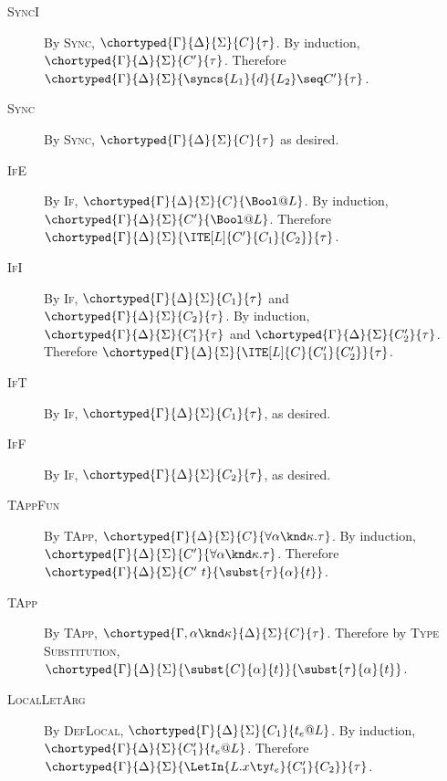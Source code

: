 \begin{description}
  \item[\textsc{SyncI}]
  By \textsc{Sync}, $\chortyped{\Gamma}{\Delta}{\Sigma}{C}{\tau}$.
  By induction, $\chortyped{\Gamma}{\Delta}{\Sigma}{C'}{\tau}$.
  Therefore $\chortyped{\Gamma}{\Delta}{\Sigma}{\syncs{L_1}{d}{L_2} \seq C'}{\tau}$.

  \item[\textsc{Sync}]
  By \textsc{Sync}, $\chortyped{\Gamma}{\Delta}{\Sigma}{C}{\tau}$ as desired.

  \item[\textsc{IfE}]
  By \textsc{If}, $\chortyped{\Gamma}{\Delta}{\Sigma}{C}{\Bool @ L}$.
  By induction, $\chortyped{\Gamma}{\Delta}{\Sigma}{C'}{\Bool @ L}$.
  Therefore $\chortyped{\Gamma}{\Delta}{\Sigma}{\ITE[L]{C'}{C_1}{C_2}}{\tau}$.

  \item[\textsc{IfI}]
  By \textsc{If}, $\chortyped{\Gamma}{\Delta}{\Sigma}{C_1}{\tau}$ and $\chortyped{\Gamma}{\Delta}{\Sigma}{C_2}{\tau}$.
  By induction, $\chortyped{\Gamma}{\Delta}{\Sigma}{C_1'}{\tau}$ and $\chortyped{\Gamma}{\Delta}{\Sigma}{C_2'}{\tau}$.
  Therefore $\chortyped{\Gamma}{\Delta}{\Sigma}{\ITE[L]{C}{C_1'}{C_2'}}{\tau}$.

  \item[\textsc{IfT}]
  By \textsc{If}, $\chortyped{\Gamma}{\Delta}{\Sigma}{C_1}{\tau}$, as desired.

  \item[\textsc{IfF}]
  By \textsc{If}, $\chortyped{\Gamma}{\Delta}{\Sigma}{C_2}{\tau}$, as desired.

  \item[\textsc{TAppFun}]
  By \textsc{TApp}, $\chortyped{\Gamma}{\Delta}{\Sigma}{C}{\forall \alpha \knd \kappa.\tau}$.
  By induction, $\chortyped{\Gamma}{\Delta}{\Sigma}{C'}{\forall \alpha \knd \kappa.\tau}$.
  Therefore $\chortyped{\Gamma}{\Delta}{\Sigma}{C'~t}{\subst{\tau}{\alpha}{t}}$.

  \item[\textsc{TApp}]
  By \textsc{TApp}, $\chortyped{\Gamma, \alpha \knd \kappa}{\Delta}{\Sigma}{C}{\tau}$.
  Therefore by \textsc{Type Substitution}, $\chortyped{\Gamma}{\Delta}{\Sigma}{\subst{C}{\alpha}{t}}{\subst{\tau}{\alpha}{t}}$.

  \item[\textsc{LocalLetArg}]
  By \textsc{DefLocal}, $\chortyped{\Gamma}{\Delta}{\Sigma}{C_1}{t_e @ L}$.
  By induction, $\chortyped{\Gamma}{\Delta}{\Sigma}{C_1'}{t_e @ L}$.
  Therefore $\chortyped{\Gamma}{\Delta}{\Sigma}{\LetIn{L.x \ty t_e}{C_1'}{C_2}}{\tau}$.


\end{description}
